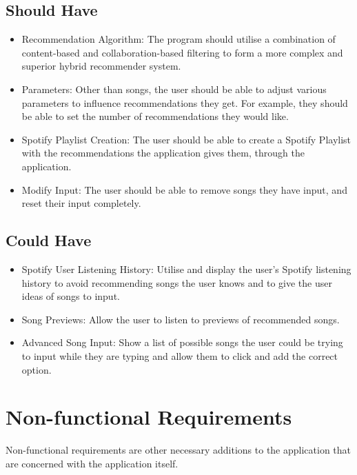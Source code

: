 \documentclass{l4proj}
\begin{document}
\subsection{Should Have}
\begin{itemize}
    \item Recommendation Algorithm: The program should utilise a combination of content-based and collaboration-based filtering to form a more complex and superior hybrid recommender system.
    \item Parameters: Other than songs, the user should be able to adjust various parameters to influence recommendations they get. For example, they should be able to set the number of recommendations they would like.
    \item Spotify Playlist Creation: The user should be able to create a Spotify Playlist with the recommendations the application gives them, through the application.
    \item Modify Input: The user should be able to remove songs they have input, and reset their input completely.
\end{itemize}
\subsection{Could Have}
\begin{itemize}
    \item Spotify User Listening History: Utilise 
 and display the user's Spotify listening history to avoid recommending songs the user knows and to give the user ideas of songs to input.
    \item Song Previews: Allow the user to listen to previews of recommended songs.
    \item Advanced Song Input: Show a list of possible songs the user could be trying to input while they are typing and allow them to click and add the correct option.
\end{itemize}
\section{Non-functional Requirements}
Non-functional requirements are other necessary additions to the application that are concerned with the application itself.
\end{document}
